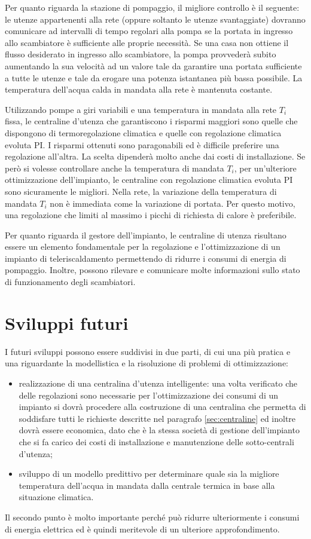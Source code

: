 \documentclass[laurea,oneside,11pt]{USiena_tesiLM3}
\begin{document}
Per quanto riguarda la stazione di pompaggio, il migliore controllo è il seguente: le utenze appartenenti alla rete (oppure soltanto le utenze svantaggiate)  dovranno comunicare ad intervalli di tempo regolari alla pompa se la portata in ingresso allo scambiatore è sufficiente alle proprie necessità. Se una casa non ottiene il flusso desiderato in ingresso allo scambiatore, la pompa provvederà subito aumentando la sua velocità ad un valore tale da garantire una portata sufficiente a tutte le utenze e tale da erogare una potenza istantanea più bassa possibile. La temperatura dell'acqua calda in mandata alla rete è mantenuta costante.

Utilizzando pompe a giri variabili e una temperatura in mandata alla rete $T_i$ fissa, le centraline d'utenza che garantiscono i risparmi maggiori sono quelle che dispongono di termoregolazione climatica e quelle con regolazione climatica evoluta PI. I risparmi ottenuti sono paragonabili ed è difficile preferire una regolazione all'altra. La scelta dipenderà molto anche dai costi di installazione. Se però si volesse controllare anche la temperatura di mandata $T_i$, per un'ulteriore ottimizzazione dell'impianto, le centraline con regolazione climatica evoluta PI sono sicuramente le migliori. Nella rete, la variazione della temperatura di mandata $T_i$ non è immediata come la variazione di portata. Per questo motivo, una regolazione che limiti al massimo i picchi di richiesta di calore è preferibile.

Per quanto riguarda il gestore dell'impianto, le centraline di utenza risultano essere un elemento fondamentale per la regolazione e l'ottimizzazione di un impianto di teleriscaldamento permettendo di ridurre i consumi di energia di pompaggio.  Inoltre, possono rilevare e comunicare   molte informazioni sullo stato di funzionamento degli scambiatori.


\section{Sviluppi futuri}
I futuri sviluppi possono essere suddivisi in due parti, di cui una più pratica e una riguardante la modellistica e la risoluzione di problemi di ottimizzazione: 
\begin{itemize}
\item  realizzazione di una centralina d'utenza intelligente: una volta verificato che delle regolazioni sono necessarie per l'ottimizzazione dei consumi di un impianto si dovrà procedere alla costruzione di una centralina che permetta di soddisfare tutti le richieste descritte nel paragrafo \ref{sec:centraline} ed inoltre dovrà essere economica, dato che è la stessa società  di gestione dell'impianto che si fa carico dei costi di installazione e manutenzione delle sotto-centrali d'utenza;
\item sviluppo di un modello predittivo per determinare quale sia la migliore temperatura dell'acqua in mandata dalla centrale termica in base alla situazione climatica.
\end{itemize}
Il secondo punto è molto importante perché può ridurre ulteriormente i consumi di energia elettrica ed è quindi meritevole di un ulteriore approfondimento. 
 
\end{document}
